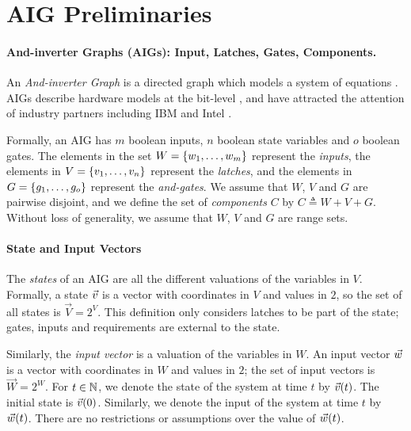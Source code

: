 \section{AIG Preliminaries}
\paragraph{And-inverter Graphs (AIGs): Input, Latches, Gates, Components.}
An \emph{And-inverter Graph} is a directed graph which models a system of equations \cite{AIGs,AIGs2}. AIGs describe hardware models at the bit-level \cite{AIGER}, and have attracted the attention of industry partners including IBM and Intel \cite{HWMCC2014BM}. 

Formally, an AIG has $m$ boolean 
inputs, $n$ boolean state variables and $o$ boolean gates. The elements in the set 
$W=\left\{w_1, \ldots, w_m\right\}$ represent the \emph{inputs}, the elements in 
$V=\left\{v_1, \ldots, v_n\right\}$ represent the \emph{latches}, and the elements in 
$G=\left\{g_1, \ldots, g_o\right\}$ represent the \emph{and-gates}. We assume that $W$, $V$ and $G$ are pairwise disjoint, and we define the set of \emph{components} $C$ by $C\triangleq W + V + G$. Without loss of generality, we assume that $W$, $V$ and $G$ are range sets.



\paragraph{State and Input Vectors}
\label{sec:Preliminaries:AIGStates}
The \emph{states} of an AIG are all the different valuations of the variables in $V$.
Formally, a state $\vec{v}$ is a vector with coordinates in $V$ and values in $2$, so the set of all states is $\vec{V}=2^V$. This definition only considers latches to be part of the state; gates, inputs and requirements are external to the state.

Similarly, the \emph{input vector} is a
valuation of the variables in $W$. An input vector $\vec{w}$ is a vector with coordinates in $W$ and values in $2$; the set of input vectors is $\vec{W}=2^W$. 
For  $t\in \mathbb{N}$, we denote the state of the system at time $t$ by $\vec{v}(t)$.
The initial state is $\vec{v}(0)$. %
Similarly, we denote the input of the system at time $t$ by $\vec{w}(t)$. %
There are no restrictions or assumptions over the value of $\vec{w}(t)$.%

